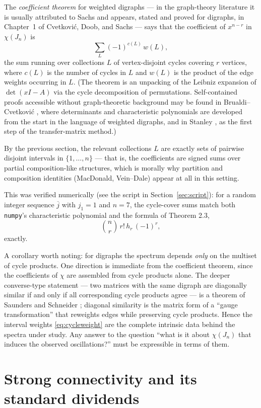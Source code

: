 \documentclass[11pt, fleqn]{amsart}
\theoremstyle{remark}
\begin{document}
The \emph{coefficient theorem} for weighted digraphs --- in the
graph-theory literature it is usually attributed to Sachs and appears,
stated and proved for digraphs, in Chapter~1 of Cvetkovi\'c, Doob, and
Sachs \cite{CDS95} --- says that the coefficient of $x^{n-r}$ in
$\chi(J_n)$ is
\[
\sum_{L} (-1)^{c(L)}\, w(L),
\]
the sum running over collections $L$ of vertex-disjoint cycles covering
$r$ vertices, where $c(L)$ is the number of cycles in $L$ and $w(L)$ is
the product of the edge weights occurring in $L$. (The theorem is an
unpacking of the Leibniz expansion of $\det(xI-A)$ via the cycle
decomposition of permutations. Self-contained proofs accessible without
graph-theoretic background may be found in Brualdi--Cvetkovi\'c
\cite{BC09}, where determinants and characteristic polynomials are
developed from the start in the language of weighted digraphs, and in
Stanley \cite[\S 4.7]{Stanley12}, as the first step of the
transfer-matrix method.)

By the previous section, the relevant collections $L$ are exactly sets
of pairwise disjoint intervals in $\{1,\dots,n\}$ --- that is, the
coefficients are signed sums over partial composition-like structures,
which is morally why partition and composition identities (MacDonald,
Vein--Dale) appear at all in this setting.

This was verified numerically (see the script in
Section~\ref{sec:script}): for a random integer sequence $\overline{j}$
with $j_1=1$ and $n=7$, the cycle-cover sums match both \texttt{numpy}'s
characteristic polynomial and the formula of Theorem 2.3,
\[
\binom{n}{r}\, r!\, h_r\, (-1)^r,
\]
exactly.

A corollary worth noting: for digraphs the spectrum depends \emph{only}
on the multiset of cycle products. One direction is immediate from the
coefficient theorem, since the coefficients of $\chi$ are assembled
from cycle products alone. The deeper converse-type statement --- two
matrices with the same digraph are diagonally similar if and only if
all corresponding cycle products agree --- is a theorem of Saunders and
Schneider \cite{SS78}; diagonal similarity is the matrix form of a
``gauge transformation'' that reweights edges while preserving cycle
products. Hence the interval weights \eqref{eq:cycleweight} are the
complete intrinsic data behind the spectra under study. Any answer to
the question ``what is it about $\chi(J_n)$ that induces the observed
oscillations?'' must be expressible in terms of them.

\section{Strong connectivity and its standard dividends}
\end{document}
